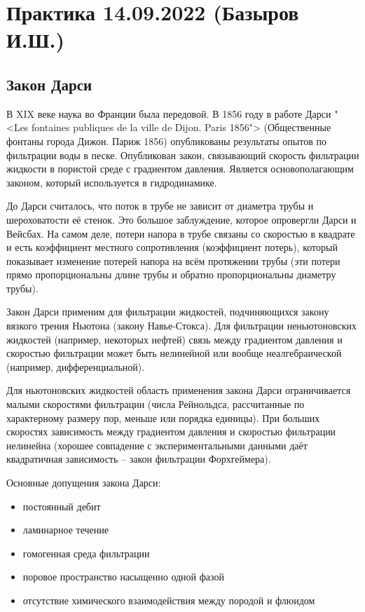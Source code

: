 \documentclass[main.tex]{subfiles}
\begin{document}
\section{Практика 14.09.2022 (Базыров И.Ш.)}

\subsection{Закон Дарси}

В XIX веке наука во Франции была передовой.
В 1856 году в работе Дарси "<Les fontaines publiques de la ville de Dijon. Paris 1856"> (Общественные фонтаны города Дижон. Париж 1856) опубликованы результаты опытов по фильтрации воды в песке.
Опубликован закон, связывающий скорость фильтрации жидкости в пористой среде с градиентом давления.
Является основополагающим законом, который используется в гидродинамике.

До Дарси считалось, что поток в трубе не зависит от диаметра трубы и шероховатости её стенок. Это большое заблуждение, которое опровергли Дарси и Вейсбах.
На самом деле, потери напора в трубе связаны со скоростью в квадрате и есть коэффициент местного сопротивления (коэффициент потерь), который показывает изменение потерей напора на всём протяжении трубы (эти потери прямо пропорциональны длине трубы и обратно пропорциональны диаметру трубы).

Закон Дарси применим для фильтрации жидкостей, подчиняющихся закону вязкого трения Ньютона (закону Навье-Стокса).
Для фильтрации неньютоновских жидкостей (например, некоторых нефтей) связь между градиентом давления и скоростью фильтрации может быть нелинейной или вообще неалгебраической (например, дифференциальной).

Для ньютоновских жидкостей область применения закона Дарси ограничивается малыми скоростями фильтрации (числа Рейнольдса, рассчитанные по характерному размеру пор, меньше или порядка единицы).
При больших скоростях зависимость между градиентом давления и скоростью фильтрации нелинейна (хорошее совпадение с экспериментальными данными даёт квадратичная зависимость -- закон фильтрации Форхгеймера).

Основные допущения закона Дарси:
\begin{itemize}
\item постоянный дебит
\item ламинарное течение
\item гомогенная среда фильтрации
\item поровое пространство насыщенно одной фазой
\item отсутствие химического взаимодействия между породой и флюидом
\end{itemize}
\end{document}
